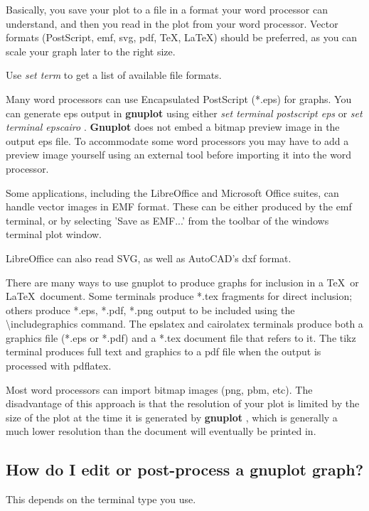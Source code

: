 \documentclass[a4paper,11pt]{article}
\newcommand{\gnuplot}{\textbf{gnuplot }}
\newcommand{\Gnuplot}{\textbf{Gnuplot }}
\begin{document}
Basically, you save your plot to a file in a format your word processor
can understand, and then you read in the plot from your word processor. Vector
formats (PostScript, emf, svg, pdf, \TeX{}, \LaTeX{}) should be preferred,
as you can scale your graph later to the right size.

Use {\em set term} to get a list of available file formats.

Many word processors can use Encapsulated PostScript (*.eps) for graphs.
You can generate eps output in \gnuplot using either
{\em set terminal postscript eps}
or
{\em set terminal epscairo}
.
\Gnuplot does not embed a bitmap preview image in the output eps file.
To accommodate some word processors you may have to add a preview image yourself
using an external tool before importing it into the word processor.

Some applications, including the LibreOffice and Microsoft Office suites,
can handle vector images in EMF format. These can be either produced by the emf
terminal, or by selecting 'Save as EMF...' from the toolbar of the
windows terminal plot window.

LibreOffice can also read SVG, as well as AutoCAD's dxf format.

There are many ways to use gnuplot to produce graphs for inclusion in a
\TeX\ or \LaTeX\ document.
Some terminals produce *.tex fragments for direct inclusion; others
produce *.eps, *.pdf, *.png output to be included using the
\textbackslash{}includegraphics command.
The epslatex and cairolatex terminals produce both a graphics
file (*.eps or *.pdf) and a *.tex document file that refers to it.
The tikz terminal produces full text and graphics to a pdf file
when the output is processed with pdflatex.

Most word processors can import bitmap images (png, pbm, etc).
The disadvantage of this approach is that the resolution of your
plot is limited by the size of the plot at the time it is generated
by \gnuplot, which is generally a much lower resolution than the
document will eventually be printed in.


\subsection{How do I edit or post-process a \gnuplot graph?}

This depends on the terminal type you use.
\end{document}
